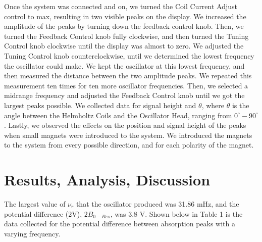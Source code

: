 \documentclass[twoside,10pt]{article}
\begin{document}
\begin{multicols}{2}
		\indent Once the system was connected and on, we turned the Coil Current Adjust control to max, resulting in two visible peaks on the display. We increased the amplitude of the peaks by turning down the feedback control knob. Then, we turned the Feedback Control knob fully clockwise, and then turned the Tuning Control knob clockwise until the display was almost to zero. We adjusted the Tuning Control knob counterclockwise, until we determined the lowest frequency the oscillator could make. We kept the oscillator at this lowest frequency, and then measured the distance between the two amplitude peaks. We repeated this measurement ten times for ten more oscillator frequencies. Then, we selected a midrange frequency and adjusted the Feedback Control knob until we got the largest peaks possible. We collected data for signal height and $\theta$, where $\theta$ is the angle between the Helmholtz Coils and the Oscillator Head, ranging from $0^{\circ} - 90^{\circ}$. Lastly, we observed the effects on the position and signal height of the peaks when small magnets were introduced to the system. We introduced the magnets to the system from every possible direction, and for each polarity of the magnet. 

		
		\section{Results, Analysis, Discussion}
		
		The largest value of $\nu_r$ that the oscillator produced was 31.86 mHz, and the potential difference (2V), $2B_{0-Res}$, was 3.8 V. Shown below in Table 1 is the data collected for the potential difference between absorption peaks with a varying frequency. 
		

\end{multicols}
\end{document}
